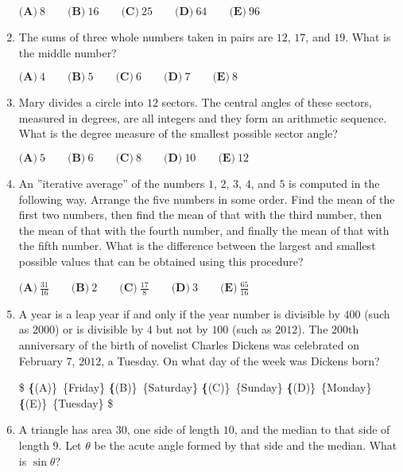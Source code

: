 \documentclass{article}
\begin{document}
\begin{enumerate}[label=\arabic*., itemsep=0.5em]
$ \textbf{(A)}\ 8\qquad\textbf{(B)}\ 16\qquad\textbf{(C)}\ 25\qquad\textbf{(D)}\ 64\qquad\textbf{(E)}\ 96 $\par \vspace{0.5em}\item The sums of three whole numbers taken in pairs are $12$, $17$, and $19$.  What is the middle number?

$ \textbf{(A)}\ 4\qquad\textbf{(B)}\ 5\qquad\textbf{(C)}\ 6\qquad\textbf{(D)}\ 7\qquad\textbf{(E)}\ 8 $\par \vspace{0.5em}\item Mary divides a circle into $12$ sectors.  The central angles of these sectors, measured in degrees, are all integers and they form an arithmetic sequence.  What is the degree measure of the smallest possible sector angle?

$ \textbf{(A)}\ 5\qquad\textbf{(B)}\ 6\qquad\textbf{(C)}\ 8\qquad\textbf{(D)}\ 10\qquad\textbf{(E)}\ 12 $\par \vspace{0.5em}\item An ''iterative average'' of the numbers $1$, $2$, $3$, $4$, and $5$ is computed in the following way.  Arrange the five numbers in some order.  Find the mean of the first two numbers, then find the mean of that with the third number, then the mean of that with the fourth number, and finally the mean of that with the fifth number.  What is the difference between the largest and smallest possible values that can be obtained using this procedure?

$ \textbf{(A)}\ \frac{31}{16}\qquad\textbf{(B)}\ 2\qquad\textbf{(C)}\ \frac{17}{8}\qquad\textbf{(D)}\ 3\qquad\textbf{(E)}\ \frac{65}{16} $\par \vspace{0.5em}\item A year is a leap year if and only if the year number is divisible by $400$ (such as $2000$) or is divisible by $4$ but not by $100$ (such as $2012$).  The $200\text{th}$ anniversary of the birth of novelist Charles Dickens was celebrated on February $7$, $2012$, a Tuesday.  On what day of the week was Dickens born?

\$ \textbf\{(A)\}\ \text\{Friday\}
\qquad\textbf\{(B)\}\ \text\{Saturday\}
\qquad\textbf\{(C)\}\ \text\{Sunday\}
\qquad\textbf\{(D)\}\ \text\{Monday\}
\qquad\textbf\{(E)\}\ \text\{Tuesday\}
 \$\par \vspace{0.5em}\item A triangle has area $30$, one side of length $10$, and the median to that side of length $9$.  Let $\theta$ be the acute angle formed by that side and the median.  What is $\sin{\theta}$?


\end{enumerate}
\end{document}
